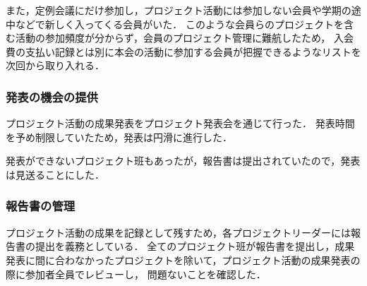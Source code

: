 また，定例会議にだけ参加し，プロジェクト活動には参加しない会員や学期の途中などで新しく入ってくる会員がいた．
このような会員らのプロジェクトを含む活動の参加頻度が分からず，会員のプロジェクト管理に難航したため，
入会費の支払い記録とは別に本会の活動に参加する会員が把握できるようなリストを次回から取り入れる．

\subsubsection*{発表の機会の提供}

プロジェクト活動の成果発表をプロジェクト発表会を通じて行った．
発表時間を予め制限していたため，発表は円滑に進行した．

発表ができないプロジェクト班もあったが，報告書は提出されていたので，発表は見送ることにした．

\subsubsection*{報告書の管理}

プロジェクト活動の成果を記録として残すため，各プロジェクトリーダーには報告書の提出を義務としている．
全てのプロジェクト班が報告書を提出し，成果発表に間に合わなかったプロジェクトを除いて，プロジェクト活動の成果発表の際に参加者全員でレビューし，
問題ないことを確認した．
